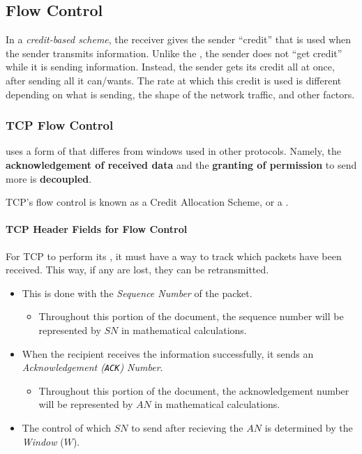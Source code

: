 \subsection{Flow Control}\label{subsec:Flow_Control}

\begin{definition}\label{def:Credit_Based_Scheme}
  In a \emph{credit-based scheme}, the receiver gives the sender ``credit'' that is used when the sender transmits information.
  Unlike the , the sender does not ``get credit'' while it is sending information.
  Instead, the sender gets its credit all at once, after sending all it can/wants.
  The rate at which this credit is used is different depending on what is sending, the shape of the network traffic, and other factors.
\end{definition}

\subsubsection{TCP Flow Control}\label{subsubsec:TCP_Flow_Control}
 uses a form of  that differes from windows used in other protocols.
Namely, the \textbf{acknowledgement of received data} and the \textbf{granting of permission} to send more is \textbf{decoupled}.

TCP's flow control is known as a Credit Allocation Scheme, or a .

\paragraph{TCP Header Fields for Flow Control}\label{par:TCP_Header_Fields_Flow_Control}
For TCP to perform its , it must have a way to track which packets have been received.
This way, if any are lost, they can be retransmitted.

\begin{itemize}[noitemsep]
\item This is done with the \emph{Sequence Number} of the packet.
  \begin{itemize}[noitemsep]
  \item Throughout this portion of the document, the sequence number will be represented by $SN$ in mathematical calculations.
  \end{itemize}
\item When the recipient receives the information successfully, it sends an \emph{Acknowledgement (\texttt{ACK}) Number}.
  \begin{itemize}[noitemsep]
  \item Throughout this portion of the document, the acknowledgement number will be represented by $AN$ in mathematical calculations.
  \end{itemize}
\item The control of which $SN$ to send after recieving the $AN$ is determined by the \emph{Window} ($W$).
\end{itemize}

